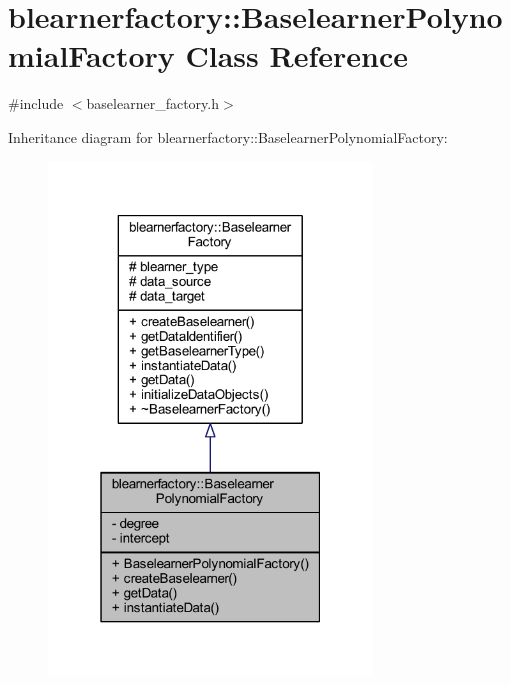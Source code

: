 \hypertarget{classblearnerfactory_1_1_baselearner_polynomial_factory}{}\section{blearnerfactory\+:\+:Baselearner\+Polynomial\+Factory Class Reference}
\label{classblearnerfactory_1_1_baselearner_polynomial_factory}


{\ttfamily \#include $<$baselearner\+\_\+factory.\+h$>$}



Inheritance diagram for blearnerfactory\+:\+:Baselearner\+Polynomial\+Factory\+:\nopagebreak
\begin{figure}[H]
\begin{center}
\leavevmode
\includegraphics[width=244pt]{classblearnerfactory_1_1_baselearner_polynomial_factory__inherit__graph}
\end{center}
\end{figure}


